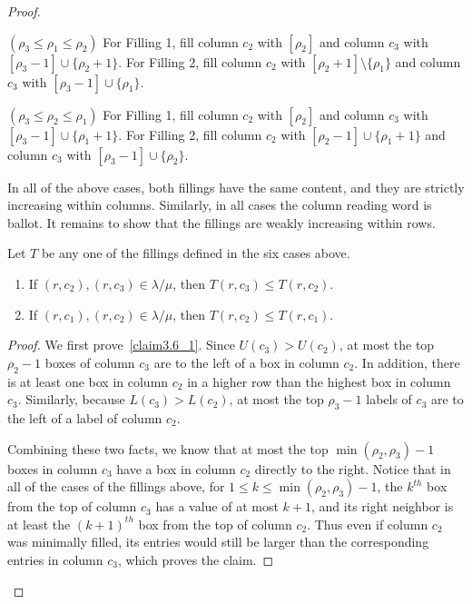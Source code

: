 \begin{proof}
\begin{Case}
{ $(\rho_3\leq \rho_1 \leq \rho_2)$} 
For Filling 1, fill column $c_2$ with $[\rho_2]$ and column $c_3$ with $[\rho_3-1]\cup \{ \rho_2+1\}$. For Filling 2, fill column $c_2$ with $[\rho_2+1]\setminus \{\rho_1\}$ and column $c_3$ with $[\rho_3-1]\cup \{\rho_1\}$.
\end{Case}

\begin{Case}
{ $(\rho_3\leq \rho_2 \leq \rho_1)$} 
For Filling 1, fill column $c_2$ with $[\rho_2]$ and column $c_3$ with $[\rho_3-1]\cup \{\rho_1+1\}$. For Filling 2, fill column $c_2$ with $[\rho_2-1]\cup \{\rho_1+1\}$ and column $c_3$ with $[\rho_3-1]\cup\{ \rho_2\}$.
\end{Case}


In all of the above cases, both fillings have the same content, and they are strictly increasing within columns. Similarly, in all cases the column reading word is ballot. It remains to show that the fillings are weakly increasing within rows.


\begin{claim}
\label{claim:c2c3}
Let $T$ be any one of the fillings defined in the six cases above. 
\begin{enumerate}[label=(\Roman{*})]
\item\label{claim3.6_1} If $(r,c_2),(r,c_3)\in \lambda/\mu$, then $T(r,c_3) \leq T(r,c_2)$.
\item\label{claim3.6_2} If $(r,c_1),(r,c_2)\in \lambda/\mu$, then $T(r,c_2) \leq T(r,c_1)$.
\end{enumerate}
\end{claim}
\begin{proof}
We first prove~\ref{claim3.6_1}. Since $U(c_3)>U(c_2)$, at most the top $\rho_2-1$ boxes of column $c_3$ are to the left of a box in column $c_2$. In addition, there is at least one box in column $c_2$ in a higher row than the highest box in column $c_3$. Similarly, because $L(c_3)>L(c_2)$, at most the top $\rho_3-1$ labels of $c_3$ are to the left of a label of column $c_2$.

Combining these two facts, we know that at most the top $\min(\rho_2,\rho_3)-1$ boxes in column $c_3$ have a box in column $c_2$ directly to the right. Notice that in all of the cases of the fillings above, for $1\leq k\leq \min(\rho_2,\rho_3)-1$, the $k^{th}$ box from the top of column $c_3$ has a value of at most $k+1$, and its right neighbor is at least the $(k+1)^{th}$ box from the top of column $c_2$. Thus even if column $c_2$ was minimally filled, its entries would still be larger than the corresponding entries in column $c_3$, which proves the claim.


\end{proof}
\end{proof}

